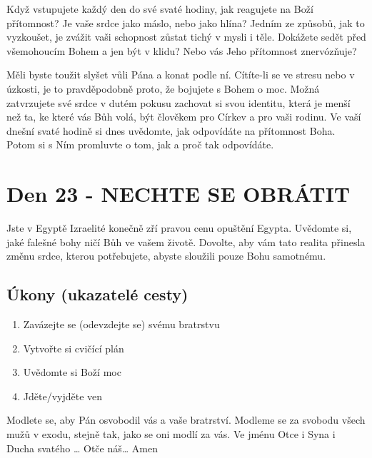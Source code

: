 \documentclass[11pt]{article}
\newcommand{\zacatekCtvrtyTyden}{
  Jste v Egyptě \newline
  Izraelité konečně zří pravou cenu opuštění Egypta. Uvědomte si, jaké falešné bohy ničí Bůh ve vašem životě.
Dovolte, aby vám tato realita přinesla změnu srdce, kterou potřebujete, abyste sloužili pouze Bohu samotnému.

\subsection*{Úkony (ukazatelé cesty)}
\begin{enumerate}
  \item Zavázejte se (odevzdejte se) svému bratrstvu
  \item Vytvořte si cvičící plán
  \item Uvědomte si Boží moc
  \item Jděte/vyjděte ven
\end{enumerate}
Modlete se, aby Pán osvobodil vás a vaše bratrství. \newline
Modleme se za svobodu všech mužů v exodu, stejně tak, jako se oni modlí za vás.\newline
Ve jménu Otce i Syna i Ducha svatého …  Otče náš… Amen
}
\begin{document}
Když vstupujete každý den do své svaté hodiny, jak reagujete na Boží přítomnost? Je vaše srdce jako máslo, nebo
jako hlína? Jedním ze způsobů, jak to vyzkoušet, je zvážit vaši schopnost zůstat tichý v mysli i těle. Dokážete sedět
před všemohoucím Bohem a jen být v klidu? Nebo vás Jeho přítomnost znervózňuje?

Měli byste toužit slyšet vůli Pána a konat podle ní. Cítíte-li se ve stresu nebo v úzkosti, je to pravděpodobně proto,
že bojujete s Bohem o moc. Možná zatvrzujete své srdce v dutém pokusu zachovat si svou identitu, která je menší
než ta, ke které vás Bůh volá, být člověkem pro Církev a pro vaši rodinu. Ve vaší dnešní svaté hodině si dnes
uvědomte, jak odpovídáte na přítomnost Boha. Potom si s Ním promluvte o tom, jak a proč tak odpovídáte.

\newpage
\section{Den 23 - NECHTE SE OBRÁTIT}
\zacatekCtvrtyTyden
\end{document}
